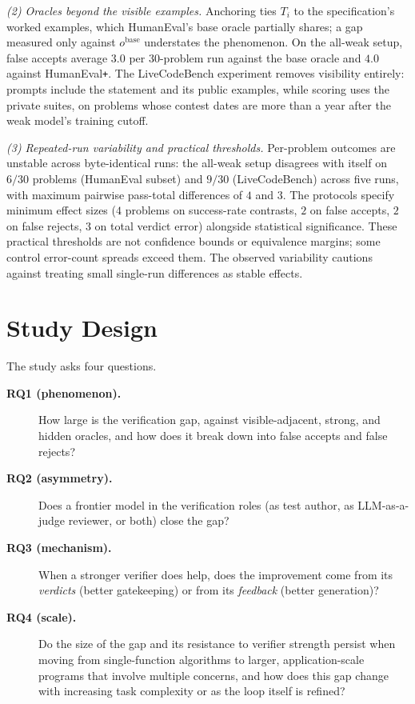 \documentclass{article}
\begin{document}
\emph{(2) Oracles beyond the visible examples.} Anchoring ties $T_i$ to the
specification's worked examples, which HumanEval's base oracle partially shares; a gap
measured only against $o^{\mathrm{base}}$ understates the phenomenon. On the all-weak
setup, false accepts average $3.0$ per 30-problem run against the base oracle and
$4.0$ against HumanEval\texttt{+}.
The LiveCodeBench experiment removes visibility entirely: prompts include the statement and its
public examples, while scoring uses the private suites, on problems whose contest dates
are more than a year after the weak model's training cutoff.

\emph{(3) Repeated-run variability and practical thresholds.} Per-problem outcomes are unstable across
byte-identical runs: the all-weak setup disagrees with itself on $6/30$ problems (HumanEval
subset) and $9/30$ (LiveCodeBench) across five runs, with maximum pairwise pass-total
differences of $4$ and $3$.
The protocols specify minimum effect sizes ($4$ problems on
success-rate contrasts, $2$ on false accepts, $2$ on false rejects, $3$ on total verdict
error) alongside statistical significance. These practical thresholds are not confidence bounds
or equivalence margins; some control error-count spreads exceed them. The observed
variability cautions against treating small single-run differences as stable effects.

\section{Study Design}
\label{sec:design}

The study asks four questions.
\begin{description}
\item[\textbf{RQ1 (phenomenon).}] How large is the verification gap, against visible-adjacent,
strong, and hidden oracles, and how does it break down into false accepts and false rejects?
\item[\textbf{RQ2 (asymmetry).}] Does a frontier model in the verification roles (as test author,
as LLM-as-a-judge reviewer, or both) close the gap?
\item[\textbf{RQ3 (mechanism).}] When a stronger verifier does help, does the improvement come
from its \emph{verdicts} (better gatekeeping) or from its \emph{feedback} (better generation)?
\item[\textbf{RQ4 (scale).}] Do the size of the gap and its resistance to verifier strength persist
when moving from single-function algorithms to larger, application-scale programs that involve
multiple concerns, and how does this gap change with increasing task complexity or as the loop
itself is refined?
\end{description}
\end{document}
